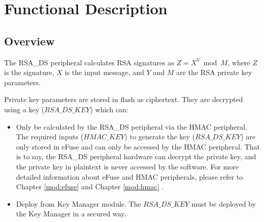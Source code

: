 \documentclass[main\_\_EN.tex]{subfiles}
\begin{document}
\section{Functional Description}
\subsection{Overview}

The RSA\_DS peripheral calculates RSA signatures as \begin{math}Z = X^{Y} \bmod M\end{math}, where \begin{math}Z\end{math} is the signature, \begin{math}X\end{math} is the input message, and \begin{math}Y\end{math} and \begin{math}M\end{math} are the RSA private key parameters.

Private key parameters are stored in flash as ciphertext. They are decrypted using a key (\begin{math} RSA\_DS\_KEY \end{math}) which can:
\begin{itemize}
    \item Only be calculated by the RSA\_DS peripheral via the HMAC peripheral. The required inputs (\begin{math} HMAC\_KEY \end{math}) to generate the key (\begin{math}RSA\_DS\_KEY\end{math}) are only stored in eFuse and can only be accessed by the HMAC peripheral. That is to say, the RSA\_DS peripheral hardware can decrypt the private key, and the private key in plaintext is never accessed by the software. For more detailed information about eFuse and HMAC peripherals, please refer to Chapter \ref{mod:efuse} \textit{} and Chapter \ref{mod:hmac} \textit{}.
    \item Deploy from Key Manager module. The \begin{math} RSA\_DS\_KEY \end{math} must be deployed by the Key Manager in a secured way.
\end{itemize}
\end{document}
